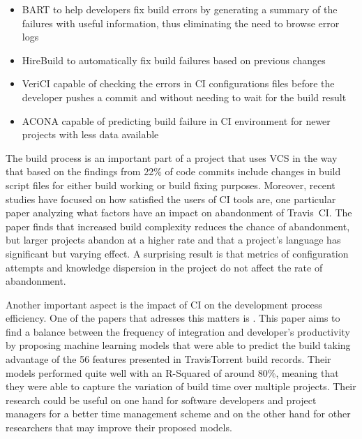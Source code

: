 \documentclass[]{book}
\providecommand{\tightlist}{%
  \setlength{\itemsep}{0pt}\setlength{\parskip}{0pt}}
\begin{document}
\begin{itemize}
\tightlist
\item
  BART to help developers fix build errors by generating a summary of
  the failures with useful information, thus eliminating the need to
  browse error logs \citet{vassallo2018break}
\item
  HireBuild to automatically fix build failures based on previous
  changes \citet{hassan2018hirebuild}
\item
  VeriCI capable of checking the errors in CI configurations files
  before the developer pushes a commit and without needing to wait for
  the build result \citet{santolucito2018statically}
\item
  ACONA capable of predicting build failure in CI environment for newer
  projects with less data available \citet{ni2018acona}
\end{itemize}

The build process is an important part of a project that uses VCS in the
way that based on the findings from \citet{hassan2018hirebuild} 22\% of
code commits include changes in build script files for either build
working or build fixing purposes. Moreover, recent studies have focused
on how satisfied the users of CI tools are, one particular paper
\citet{widder2018m} analyzing what factors have an impact on abandonment
of Travis~CI. The paper finds that increased build complexity reduces
the chance of abandonment, but larger projects abandon at a higher rate
and that a project's language has significant but varying effect. A
surprising result is that metrics of configuration attempts and
knowledge dispersion in the project do not affect the rate of
abandonment.

Another important aspect is the impact of CI on the development process
efficiency. One of the papers that adresses this matters is
\citet{bisong2017built}. This paper aims to find a balance between the
frequency of integration and developer's productivity by proposing
machine learning models that were able to predict the build taking
advantage of the 56 features presented in TravisTorrent build records.
Their models performed quite well with an R-Squared of around 80\%,
meaning that they were able to capture the variation of build time over
multiple projects. Their research could be useful on one hand for
software developers and project managers for a better time management
scheme and on the other hand for other researchers that may improve
their proposed models.
\end{document}
